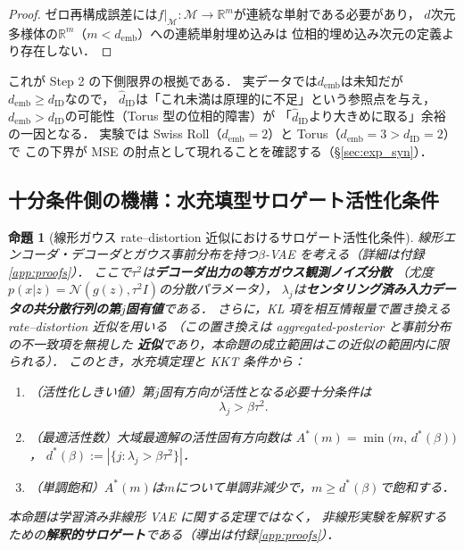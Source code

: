 \documentclass[11pt,a4paper]{jsarticle}
\newtheorem{proposition}{命題}
\newcommand{\dID}{d_{\mathrm{ID}}}
\newcommand{\hatdID}{\hat{d}_{\mathrm{ID}}}
\newcommand{\R}{\mathbb{R}}
\newcommand{\demb}{d_{\mathrm{emb}}}
\newcommand{\dstar}{d^{*}(\beta)}
\begin{document}
\begin{proof}
ゼロ再構成誤差には$f|_\mathcal{M}: \mathcal{M} \to \R^m$が連続な単射である必要があり，
$d$次元多様体の$\R^m$（$m < \demb$）への連続単射埋め込みは
位相的埋め込み次元の定義より存在しない\cite{hatcher2002algebraic}．
\end{proof}

これが Step 2 の下側限界の根拠である．
実データでは$\demb$は未知だが$\demb \geq \dID$なので，
$\hatdID$は「これ未満は原理的に不足」という参照点を与え，
$\demb > \dID$の可能性（Torus 型の位相的障害）が
「$\hatdID$より大きめに取る」余裕の一因となる．
実験では Swiss Roll（$\demb = 2$）と Torus（$\demb = 3 > \dID = 2$）で
この下界が MSE の肘点として現れることを確認する（§\ref{sec:exp_syn}）．

\subsection{十分条件側の機構：水充填型サロゲート活性化条件}\label{sec:theory_wf}

\begin{proposition}[線形ガウス rate--distortion 近似におけるサロゲート活性化条件]\label{thm:linear_vae}
線形エンコーダ・デコーダとガウス事前分布を持つ$\beta$-VAE を考える（詳細は付録\ref{app:proofs}）．
ここで$\tau^2$は\textbf{デコーダ出力の等方ガウス観測ノイズ分散}
（尤度$p(x|z) = \mathcal{N}(g(z), \tau^2 I)$の分散パラメータ），
$\lambda_j$は\textbf{センタリング済み入力データの共分散行列の第$j$固有値}である．
さらに，KL 項を相互情報量で置き換える rate--distortion 近似を用いる
（この置き換えは aggregated-posterior と事前分布の不一致項を無視した
\textbf{近似}であり，本命題の成立範囲はこの近似の範囲内に限られる）．
このとき，水充填定理と KKT 条件から：
\begin{enumerate}
  \item （活性化しきい値）第$j$固有方向が活性となる必要十分条件は
        \begin{equation}
          \lambda_j > \beta \tau^2 .
          \label{eq:au_threshold}
        \end{equation}
  \item （最適活性数）大域最適解の活性固有方向数は
        $A^*(m) = \min\bigl(m,\, \dstar\bigr)$，
        $\dstar := |\{j : \lambda_j > \beta\tau^2\}|$．
  \item （単調飽和）$A^*(m)$は$m$について単調非減少で，$m \geq \dstar$で飽和する．
\end{enumerate}
本命題は学習済み非線形 VAE に関する定理ではなく，
非線形実験を解釈するための\textbf{解釈的サロゲート}である（導出は付録\ref{app:proofs}）．
\end{proposition}
\end{document}
